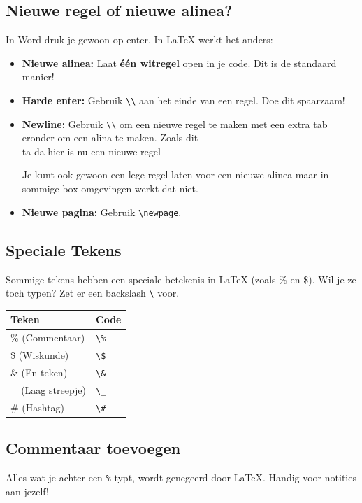 \documentclass[a4paper,11pt]{article}
\begin{document}
\subsection{Nieuwe regel of nieuwe alinea?}
In Word druk je gewoon op enter. In LaTeX werkt het anders:

\begin{itemize}
    \item \textbf{Nieuwe alinea:} Laat \textbf{één witregel} open in je code. Dit is de standaard manier!
    \item \textbf{Harde enter:} Gebruik \texttt{\textbackslash\textbackslash} aan het einde van een regel. Doe dit spaarzaam!
    \item \textbf{Newline:} Gebruik \verb|\\| om een nieuwe regel te maken met een extra tab eronder om een alina 
    te maken. Zoals dit\\

    ta da hier is nu een nieuwe regel

    Je kunt ook gewoon een lege regel laten voor een nieuwe alinea maar in sommige box omgevingen werkt dat niet.
    \item \textbf{Nieuwe pagina:} Gebruik \texttt{\textbackslash newpage}.
\end{itemize}

\subsection{Speciale Tekens}
Sommige tekens hebben een speciale betekenis in LaTeX (zoals \% en \$). Wil je ze toch typen? Zet er een backslash \texttt{\textbackslash} voor.

\begin{tabular}{ll}
\toprule
\textbf{Teken} & \textbf{Code} \\
\midrule
\% (Commentaar) & \texttt{\textbackslash\%} \\
\$ (Wiskunde) & \texttt{\textbackslash\$} \\
\& (En-teken) & \texttt{\textbackslash\&} \\
\_ (Laag streepje) & \texttt{\textbackslash\_} \\
\# (Hashtag) & \texttt{\textbackslash\#} \\
\bottomrule
\end{tabular}

\subsection{Commentaar toevoegen}
Alles wat je achter een \texttt{\%} typt, wordt genegeerd door LaTeX. Handig voor notities aan jezelf!
\end{document}
